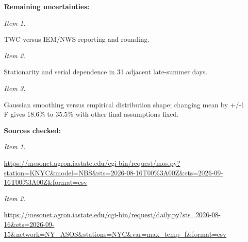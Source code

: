 \documentclass[11pt]{article}
\begin{document}
\par\noindent\textbf{Remaining uncertainties:} \par \par\noindent\textit{Item 1.}\par TWC versus IEM/NWS reporting and rounding.

\par\noindent\textit{Item 2.}\par Stationarity and serial dependence in 31 adjacent late-summer days.

\par\noindent\textit{Item 3.}\par Gaussian smoothing versus empirical distribution shape; changing mean by +/-1 F gives 18.6\% to 35.5\% with other final assumptions fixed.

\par\noindent\textbf{Sources checked:} \par \par\noindent\textit{Item 1.}\par \href{https://mesonet.agron.iastate.edu/cgi-bin/request/mos.py?station=KNYC\&model=NBS\&sts=2026-08-16T00\%3A00Z\&ets=2026-09-16T00\%3A00Z\&format=csv}{https://meso\hspace{0pt}net.agron.ia\hspace{0pt}state.edu/cg\hspace{0pt}i-bin/reques\hspace{0pt}t/mos.py?sta\hspace{0pt}tion=KNYC\&mo\hspace{0pt}del=NBS\&sts=\hspace{0pt}2026-08-16T0\hspace{0pt}0\%3A00Z\&ets=\hspace{0pt}2026-09-16T0\hspace{0pt}0\%3A00Z\&form\hspace{0pt}at=csv}

\par\noindent\textit{Item 2.}\par \href{https://mesonet.agron.iastate.edu/cgi-bin/request/daily.py?sts=2026-08-16\&ets=2026-09-15\&network=NY\_ASOS\&stations=NYC\&var=max\_temp\_f\&format=csv}{https://meso\hspace{0pt}net.agron.ia\hspace{0pt}state.edu/cg\hspace{0pt}i-bin/reques\hspace{0pt}t/daily.py?s\hspace{0pt}ts=2026-08-1\hspace{0pt}6\&ets=2026-0\hspace{0pt}9-15\&network\hspace{0pt}=NY\_ASOS\&sta\hspace{0pt}tions=NYC\&va\hspace{0pt}r=max\_temp\_f\hspace{0pt}\&format=csv}
\end{document}
